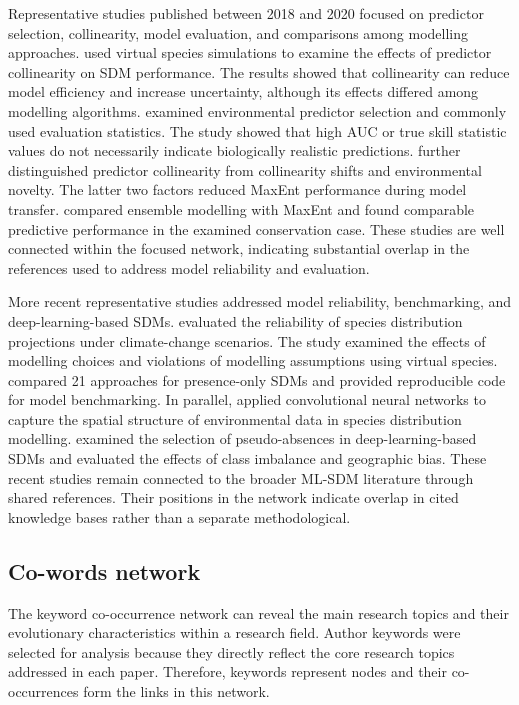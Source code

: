 \documentclass[authoryear,preprint,review,12pt]{elsarticle}
\begin{document}
Representative studies published between 2018 and 2020 focused on predictor selection, collinearity, model evaluation, and comparisons among modelling approaches. \cite{de2018evaluating} used virtual species simulations to examine the effects of predictor collinearity on SDM performance. The results showed that collinearity can reduce model efficiency and increase uncertainty, although its effects differed among modelling algorithms. \cite{fourcade2018paintings} examined environmental predictor selection and commonly used evaluation statistics. The study showed that high AUC or true skill statistic values do not necessarily indicate biologically realistic predictions. \cite{feng2019collinearity} further distinguished predictor collinearity from collinearity shifts and environmental novelty. The latter two factors reduced MaxEnt performance during model transfer. \cite{kaky2020comparison} compared ensemble modelling with MaxEnt and found comparable predictive performance in the examined conservation case. These studies are well connected within the focused network, indicating substantial overlap in the references used to address model reliability and evaluation.

More recent representative studies addressed model reliability, benchmarking, and deep-learning-based SDMs. \cite{santini2021assessing} evaluated the reliability of species distribution projections under climate-change scenarios. The study examined the effects of modelling choices and violations of modelling assumptions using virtual species. \cite{valavi2022predictive} compared 21 approaches for presence-only SDMs and provided reproducible code for model benchmarking. In parallel, \cite{deneu2021convolutional} applied convolutional neural networks to capture the spatial structure of environmental data in species distribution modelling. \cite{zbinden2024selection} examined the selection of pseudo-absences in deep-learning-based SDMs and evaluated the effects of class imbalance and geographic bias. These recent studies remain connected to the broader ML-SDM literature through shared references. Their positions in the network indicate overlap in cited knowledge bases rather than a separate methodological.


\subsection{Co-words network}

The keyword co-occurrence network can reveal the main research topics and their evolutionary characteristics within a research field. Author keywords were selected for analysis because they directly reflect the core research topics addressed in each paper. Therefore, keywords represent nodes and their co-occurrences form the links in this network. 
\end{document}
